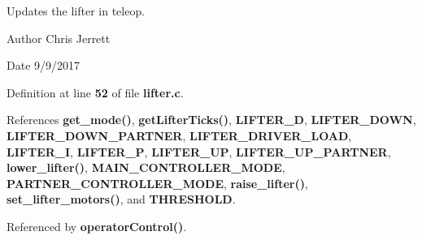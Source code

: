 Updates the lifter in teleop. 

\begin{DoxyAuthor}{Author}
Chris Jerrett 
\end{DoxyAuthor}
\begin{DoxyDate}{Date}
9/9/2017 
\end{DoxyDate}


Definition at line \textbf{ 52} of file \textbf{ lifter.\+c}.



References \textbf{ get\+\_\+mode()}, \textbf{ get\+Lifter\+Ticks()}, \textbf{ L\+I\+F\+T\+E\+R\+\_\+D}, \textbf{ L\+I\+F\+T\+E\+R\+\_\+\+D\+O\+WN}, \textbf{ L\+I\+F\+T\+E\+R\+\_\+\+D\+O\+W\+N\+\_\+\+P\+A\+R\+T\+N\+ER}, \textbf{ L\+I\+F\+T\+E\+R\+\_\+\+D\+R\+I\+V\+E\+R\+\_\+\+L\+O\+AD}, \textbf{ L\+I\+F\+T\+E\+R\+\_\+I}, \textbf{ L\+I\+F\+T\+E\+R\+\_\+P}, \textbf{ L\+I\+F\+T\+E\+R\+\_\+\+UP}, \textbf{ L\+I\+F\+T\+E\+R\+\_\+\+U\+P\+\_\+\+P\+A\+R\+T\+N\+ER}, \textbf{ lower\+\_\+lifter()}, \textbf{ M\+A\+I\+N\+\_\+\+C\+O\+N\+T\+R\+O\+L\+L\+E\+R\+\_\+\+M\+O\+DE}, \textbf{ P\+A\+R\+T\+N\+E\+R\+\_\+\+C\+O\+N\+T\+R\+O\+L\+L\+E\+R\+\_\+\+M\+O\+DE}, \textbf{ raise\+\_\+lifter()}, \textbf{ set\+\_\+lifter\+\_\+motors()}, and \textbf{ T\+H\+R\+E\+S\+H\+O\+LD}.



Referenced by \textbf{ operator\+Control()}.


